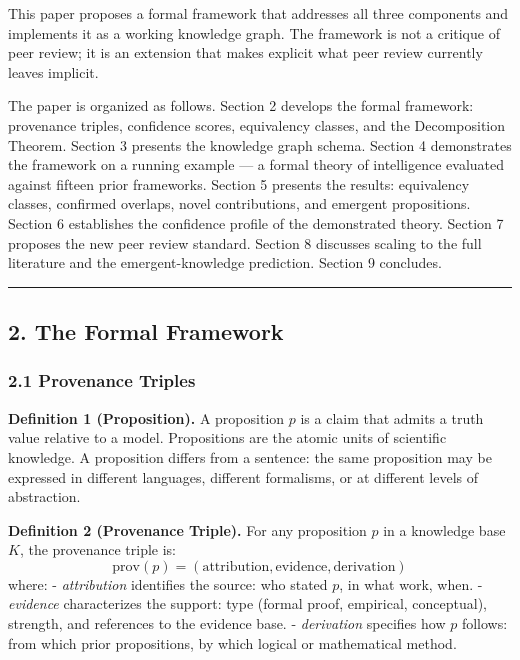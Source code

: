 \documentclass[
]{article}
\begin{document}
This paper proposes a formal framework that addresses all three
components and implements it as a working knowledge graph. The framework
is not a critique of peer review; it is an extension that makes explicit
what peer review currently leaves implicit.

The paper is organized as follows. Section 2 develops the formal
framework: provenance triples, confidence scores, equivalency classes,
and the Decomposition Theorem. Section 3 presents the knowledge graph
schema. Section 4 demonstrates the framework on a running example --- a
formal theory of intelligence evaluated against fifteen prior
frameworks. Section 5 presents the results: equivalency classes,
confirmed overlaps, novel contributions, and emergent propositions.
Section 6 establishes the confidence profile of the demonstrated theory.
Section 7 proposes the new peer review standard. Section 8 discusses
scaling to the full literature and the emergent-knowledge prediction.
Section 9 concludes.

\begin{center}\rule{0.5\linewidth}{0.5pt}\end{center}

\subsection{2. The Formal Framework}\label{the-formal-framework}

\subsubsection{2.1 Provenance Triples}\label{provenance-triples}

\textbf{Definition 1 (Proposition).} A proposition \(p\) is a claim that
admits a truth value relative to a model. Propositions are the atomic
units of scientific knowledge. A proposition differs from a sentence:
the same proposition may be expressed in different languages, different
formalisms, or at different levels of abstraction.

\textbf{Definition 2 (Provenance Triple).} For any proposition \(p\) in
a knowledge base \(K\), the provenance triple is:
\[\text{prov}(p) = (\text{attribution}, \text{evidence}, \text{derivation})\]
where: - \emph{attribution} identifies the source: who stated \(p\), in
what work, when. - \emph{evidence} characterizes the support: type
(formal proof, empirical, conceptual), strength, and references to the
evidence base. - \emph{derivation} specifies how \(p\) follows: from
which prior propositions, by which logical or mathematical method.
\end{document}
